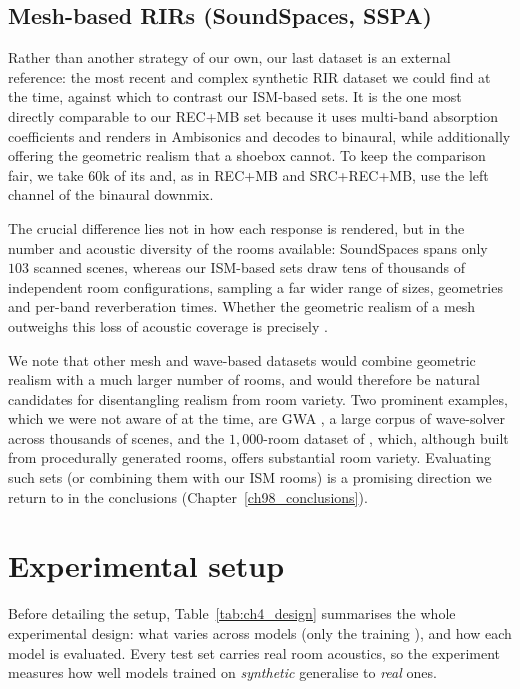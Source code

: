 \subsection{Mesh-based RIRs (SoundSpaces, SSPA)}
\label{ssec:mbrirs_sspa}

Rather than another strategy of our own, our last dataset is an external
reference: the most recent and complex synthetic \acrshort{RIR} dataset we
could find at the time, against which to contrast our \acrshort{ISM}-based
sets. It is the
one most directly comparable to our REC+MB set because it uses multi-band absorption coefficients and renders in
Ambisonics and decodes to binaural, while additionally offering the geometric realism that a shoebox
cannot. To keep the comparison fair, we take $60$k of its  and,
as in REC+MB and SRC+REC+MB, use the left channel of the binaural downmix.

\vspace{1.5cm}

The crucial difference lies not in how each response is rendered, but in the
number and acoustic diversity of the rooms available: SoundSpaces spans only
$103$ scanned scenes, whereas our \acrshort{ISM}-based sets draw tens of
thousands of independent room configurations, sampling a far wider range of
sizes, geometries and per-band reverberation times. Whether the geometric
realism of a mesh outweighs this loss of acoustic coverage is precisely 
.

We note that other mesh and wave-based datasets would combine geometric realism
with a much larger number of rooms, and would therefore be natural candidates for
disentangling realism from room variety. Two prominent examples, which we were
not aware of at the time, are GWA \citep{tang2022gwa}, a large corpus of
wave-solver  across thousands of scenes, and the $1{,}000$-room
dataset of \citet{falconperez2025scenewide}, which, although built from
procedurally generated rooms, offers substantial room variety. Evaluating such
sets (or combining them with our \acrshort{ISM} rooms) is a promising
direction we return to in the conclusions (Chapter~\ref{ch98_conclusions}).

\section{Experimental setup}
\label{sec:mbrirs_eval}
Before detailing the setup, Table~\ref{tab:ch4_design} summarises the whole
experimental design: what varies across models (only the training
), and how each model is evaluated. Every test set carries real
room acoustics, so the experiment measures how well models trained on
\emph{synthetic}  generalise to \emph{real} ones.

